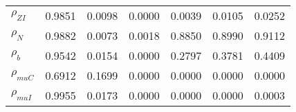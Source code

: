 \begin{center}
\begin{longtable}{lcccccc}
$ {\rho_{ZI}}          $	 & 	          0.9851	 & 	          0.0098	 & 	          0.0000	 & 	          0.0039	 & 	          0.0105	 & 	          0.0252 \\ 
$ {\rho_N}             $	 & 	          0.9882	 & 	          0.0073	 & 	          0.0018	 & 	          0.8850	 & 	          0.8990	 & 	          0.9112 \\ 
$ {\rho_b}             $	 & 	          0.9542	 & 	          0.0154	 & 	          0.0000	 & 	          0.2797	 & 	          0.3781	 & 	          0.4409 \\ 
$ {\rho_{muC}}         $	 & 	          0.6912	 & 	          0.1699	 & 	          0.0000	 & 	          0.0000	 & 	          0.0000	 & 	          0.0000 \\ 
$ {\rho_{muI}}         $	 & 	          0.9955	 & 	          0.0173	 & 	          0.0000	 & 	          0.0000	 & 	          0.0000	 & 	          0.0003 \\ 
\end{longtable}
 \end{center}
